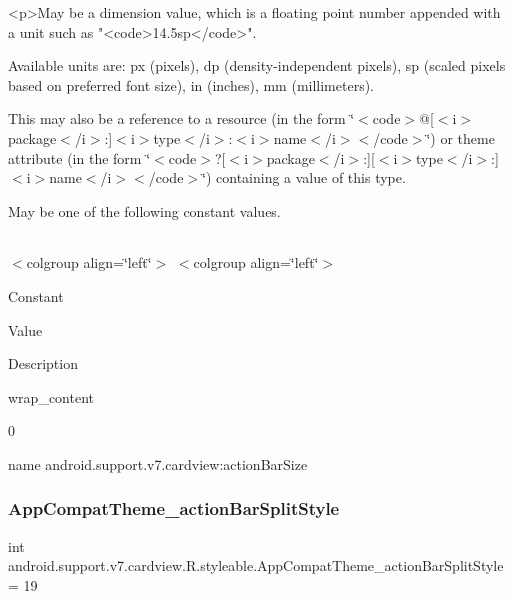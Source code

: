 \begin{DoxyVerb}      <p>May be a dimension value, which is a floating point number appended with a unit such as "<code>14.5sp</code>".
\end{DoxyVerb}
 Available units are\+: px (pixels), dp (density-\/independent pixels), sp (scaled pixels based on preferred font size), in (inches), mm (millimeters). 

This may also be a reference to a resource (in the form \char`\"{}$<$code$>$@\mbox{[}$<$i$>$package$<$/i$>$\+:\mbox{]}$<$i$>$type$<$/i$>$\+:$<$i$>$name$<$/i$>$$<$/code$>$\char`\"{}) or theme attribute (in the form \char`\"{}$<$code$>$?\mbox{[}$<$i$>$package$<$/i$>$\+:\mbox{]}\mbox{[}$<$i$>$type$<$/i$>$\+:\mbox{]}$<$i$>$name$<$/i$>$$<$/code$>$\char`\"{}) containing a value of this type. 

May be one of the following constant values.

\tabulinesep=1mm
\begin{longtabu} spread 0pt [c]{*{0}{|X[-1]}|}
\hline
\end{longtabu}
$<$colgroup align=\char`\"{}left\char`\"{}$>$ $<$colgroup align=\char`\"{}left\char`\"{}$>$ 

Constant

Value

Description 

{\ttfamily wrap\+\_\+content}

0

name android.\+support.\+v7.\+cardview\+:action\+Bar\+Size \mbox{\label{classandroid_1_1support_1_1v7_1_1cardview_1_1R_1_1styleable_ab8a026b209f8ec93d6972d986e7780ae}} 
\subsubsection{\texorpdfstring{App\+Compat\+Theme\+\_\+action\+Bar\+Split\+Style}{AppCompatTheme\_actionBarSplitStyle}}
{\footnotesize\ttfamily int android.\+support.\+v7.\+cardview.\+R.\+styleable.\+App\+Compat\+Theme\+\_\+action\+Bar\+Split\+Style = 19\hspace{0.3cm}{\ttfamily [static]}}

